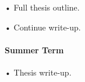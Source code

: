 \documentclass[withindex,glossary,firstyr]{cam-thesis}
\begin{document}
• Full thesis outline. 

• Continue write-up.


\paragraph{Summer Term}

• Thesis write-up.


%

\renewcommand{\bibname}{References}
\cleardoublepage
{}
{}










\printthesisindex
\end{document}
